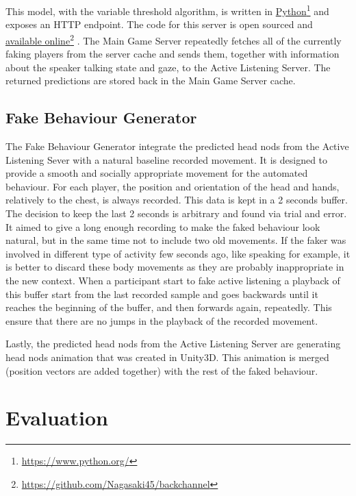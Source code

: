 \documentclass[]{simple-thesis}
\newcommand\fnurl[2]{%
  \href{#2}{#1}\footnote{\url{#2}}%
}
\begin{document}
This model, with the variable threshold algorithm, is written in \fnurl{Python}{https://www.python.org/} and exposes an HTTP endpoint.
The code for this server is open sourced and \fnurl{available online}{https://github.com/Nagasaki45/backchannel}.
The Main Game Server repeatedly fetches all of the currently faking players from the server cache and sends them, together with information about the speaker talking state and gaze, to the Active Listening Server.
The returned predictions are stored back in the Main Game Server cache.

\section{Fake Behaviour Generator}\label{system:fake_behaviour_generator}

The Fake Behaviour Generator integrate the predicted head nods from the Active Listening Sever with a natural baseline recorded movement.
It is designed to provide a smooth and socially appropriate movement for the automated behaviour.
For each player, the position and orientation of the head and hands, relatively to the chest, is always recorded.
This data is kept in a 2 seconds buffer.
The decision to keep the last 2 seconds is arbitrary and found via trial and error.
It aimed to give a long enough recording to make the faked behaviour look natural, but in the same time not to include two old movements.
If the faker was involved in different type of activity few seconds ago, like speaking for example, it is better to discard these body movements as they are probably inappropriate in the new context.
When a participant start to fake active listening a playback of this buffer start from the last recorded sample and goes backwards until it reaches the beginning of the buffer, and then forwards again, repeatedly.
This ensure that there are no jumps in the playback of the recorded movement.

Lastly, the predicted head nods from the Active Listening Server are generating head nods animation that was created in Unity3D.
This animation is merged (position vectors are added together) with the rest of the faked behaviour.


\chapter{Evaluation}\label{evaluation}
\end{document}
